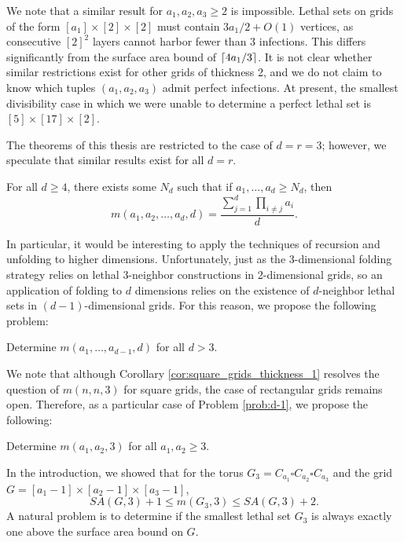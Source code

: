We note that a similar result for $a_1, a_2,a_3 \geq 2$ is impossible. Lethal sets on grids of the form $[a_1] \times [2] \times [2]$ must contain $3a_1/2+O(1)$ vertices, as consecutive $[2]^2$ layers cannot harbor fewer than 3 infections. This differs significantly from the surface area bound of $\lceil4a_1/3\rceil$. It is not clear whether similar restrictions exist for other grids of thickness 2, and we do not claim to know which tuples $(a_1,a_2,a_3)$ admit perfect infections. At present, the smallest divisibility case in which we were unable to determine a perfect lethal set is $[5] \times [17] \times [2]$. 

The theorems of this thesis are restricted to the case of $d=r=3$; however, we speculate that similar results exist for all $d=r$. 

\begin{conj}
For all $d \geq 4$, there exists some $N_d$ such that if $a_1, \dots, a_d \geq N_d$, then
$$m(a_1,a_2, \dots, a_d,d) = \frac{\sum_{j=1}^d \prod_{i \neq j} a_i}{d}.$$
\end{conj}

In particular, it would be interesting to apply the techniques of recursion and unfolding to higher dimensions. Unfortunately, just as the 3-dimensional folding strategy relies on lethal 3-neighbor constructions in 2-dimensional grids, so an application of folding to $d$ dimensions relies on the existence of $d$-neighbor lethal sets in $(d-1)$-dimensional grids. For this reason, we propose the following problem:

\begin{prob}
\label{prob:d-1}
Determine $m(a_1, \dots, a_{d-1}, d)$ for all $d > 3$.
\end{prob}

We note that although Corollary \ref{cor:square_grids_thickness_1} resolves the question of $m(n,n,3)$ for square grids, the case of rectangular grids remains open. Therefore, as a particular case of Problem \ref{prob:d-1}, we propose the following:

\begin{prob}
\label{prob:rectangular_2d}
Determine $m(a_1,a_2, 3)$ for all $a_1,a_2 \geq 3$.
\end{prob}


In the introduction, we showed that for the torus $G_{3} = C_{a_1} \square C_{a_2} \square C_{a_3}$ and the grid $G = [a_1-1] \times [a_2-1] \times [a_3-1]$,
$$SA(G, 3) + 1 \leq m(G_3,3) \leq SA(G,3)+2.$$
A natural problem is to determine if the smallest lethal set $G_3$ is always exactly one above the surface area bound on $G$.

